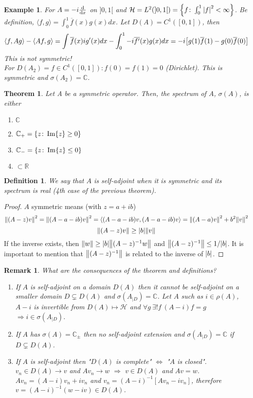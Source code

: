 \documentclass{article}
\newtheorem*{theorem}{Theorem}
\newtheorem*{definition}{Definition}
\newtheorem*{example}{Example}
\newtheorem*{remark}{Remark}
\newcommand{\RR}{\mathbb{R}}
\newcommand{\CC}{\mathbb{C}}
\newcommand{\cH}{\mathcal{H}}
\newcommand{\sig}{\sigma}
\renewcommand{\sp}[2]{\langle #1,#2 \rangle}
\begin{document}
\begin{example} 
  For $A = -i \dv{}{x}$ on $]0,1[$ and $\cH = L^2(]0,1[) = \qty{f \colon \int_0^1 \abs{f}^2 <\infty }$.
  Be definition, $\sp{f}{g} = \int_0^1 \overline{f}(x) g(x) dx$. 
  Let $D(A) = C^1([0,1])$, then
  $$ \sp{f}{Ag} - \sp{Af}{g} = \int \overline{f}(x) i g'(x) dx - \int_0^1 - i \overline{f'}(x) g(x) dx = -i \qty[ g(1) \overline{f}(1) - g(0) \overline{f}(0) ] $$
  This is not symmetric!
  \\
  For $D(A_2) = { f \in C^1([0,1]) \colon f(0) = f(1) = 0 }$ (Dirichlet).
  This is symmetric and $\sig(A_2) = \CC$.
\end{example} 

\begin{theorem}
  Let A be a symmetric operator. 
  Then, the spectrum of $A$, $\sig(A)$, is either 
  \begin{enumerate}
    \item $\CC$
    \item $\CC_+ = \qty{ z \colon \Im{z} \ge 0 }$ 
    \item $\CC_- = \qty{ z \colon \Im{z} \le 0 }$ 
    \item $\subset \RR$
  \end{enumerate}
\end{theorem}

\begin{definition} 
  We say that $A$ is self-adjoint when it is symmetric and its spectrum is real (4th case of the previous theorem).
\end{definition}

\begin{proof} 
  $A$ symmetric means (with $z = a + i b$)
  $$ \norm{(A-z) v}^2 = \norm{(A - a - i b) v}^2 = \sp{(A - a - i b)v}{(A - a - i b)v} = \norm{(A - a)v}^2 + b^2 \norm{v}^2 $$
  $$ \norm{(A-z)v} \ge \abs{b} \norm{v} $$
  If the inverse exists, then $\norm{w} \ge \abs{b} \norm{(A-z)^{-1} w}$ and $\norm{(A-z)^{-1}} \le 1/\abs{b}$.
  It is important to mention that $\norm{(A-z)^{-1}}$ is related to the inverse of $\abs{b}$.
\end{proof}

\begin{remark}
  What are the consequences of the theorem and definitions?
  \begin{enumerate}
    \item If $A$ is self-adjoint on a domain $D(A)$ then it cannot be self-adjoint on a smaller domain $D \subsetneq D(A)$ and $\sig(A_{|D}) = \CC$.
    Let $A$ such as $i \in \rho(A)$, $A - i$ is invertible from $D(A) \mapsto \cH$ and $\forall g \ \exists! f \ (A - i) f = g$ $\Rightarrow i \in \sig(A_{|D})$.
    \item If $A$ has $\sig(A) = \CC_{\pm}$ then no self-adjoint extension and $\sig(A_{|D}) = \CC$ if $D \subsetneq D(A)$.
    \item If $A$ is self-adjoint then "$D(A)$ is complete" $\Leftrightarrow$ "$A$ is closed".
    $v_n \in D(A) \to v$ and $A v_n \to w$ $\Rightarrow$ $v \in D(A)$ and $A v = w$.
    $A v_n = (A - i) v_n + i v_n$ and $v_n = (A - i)^{-1} [Av_n - i v_n]$, therefore $v = (A - i)^{-1} (w - i v) \in D(A)$.
  \end{enumerate}
\end{remark}
\end{document}
